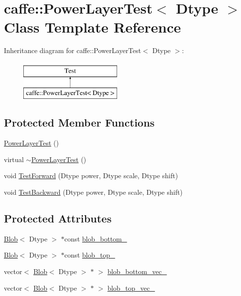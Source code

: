 \hypertarget{classcaffe_1_1_power_layer_test}{\section{caffe\+:\+:Power\+Layer\+Test$<$ Dtype $>$ Class Template Reference}
\label{classcaffe_1_1_power_layer_test}
}
Inheritance diagram for caffe\+:\+:Power\+Layer\+Test$<$ Dtype $>$\+:\begin{figure}[H]
\begin{center}
\leavevmode
\includegraphics[height=2.000000cm]{classcaffe_1_1_power_layer_test}
\end{center}
\end{figure}
\subsection*{Protected Member Functions}
\begin{DoxyCompactItemize}
\item 
\hyperlink{classcaffe_1_1_power_layer_test_abe4281737eeffb382219e492d7eb1d45}{Power\+Layer\+Test} ()
\item 
virtual \hyperlink{classcaffe_1_1_power_layer_test_a54b2038bc735caeb4648458a169272c5}{$\sim$\+Power\+Layer\+Test} ()
\item 
void \hyperlink{classcaffe_1_1_power_layer_test_a46f295334299391f8bb97cbe0c2e04bb}{Test\+Forward} (Dtype power, Dtype scale, Dtype shift)
\item 
void \hyperlink{classcaffe_1_1_power_layer_test_adb5ff2ecf5ea6fb24c2f11465929399d}{Test\+Backward} (Dtype power, Dtype scale, Dtype shift)
\end{DoxyCompactItemize}
\subsection*{Protected Attributes}
\begin{DoxyCompactItemize}
\item 
\hyperlink{classcaffe_1_1_blob}{Blob}$<$ Dtype $>$ $\ast$const \hyperlink{classcaffe_1_1_power_layer_test_ad71db592caf5da0ccd64cae0e07c65dd}{blob\+\_\+bottom\+\_\+}
\item 
\hyperlink{classcaffe_1_1_blob}{Blob}$<$ Dtype $>$ $\ast$const \hyperlink{classcaffe_1_1_power_layer_test_af8895fa8f2dfe4511855caa22a21d1b2}{blob\+\_\+top\+\_\+}
\item 
vector$<$ \hyperlink{classcaffe_1_1_blob}{Blob}$<$ Dtype $>$ $\ast$ $>$ \hyperlink{classcaffe_1_1_power_layer_test_a67e290490b55539ed56cb259b854c1ee}{blob\+\_\+bottom\+\_\+vec\+\_\+}
\item 
vector$<$ \hyperlink{classcaffe_1_1_blob}{Blob}$<$ Dtype $>$ $\ast$ $>$ \hyperlink{classcaffe_1_1_power_layer_test_a65b1b90a4491e98872084d504c53fed1}{blob\+\_\+top\+\_\+vec\+\_\+}
\end{DoxyCompactItemize}


